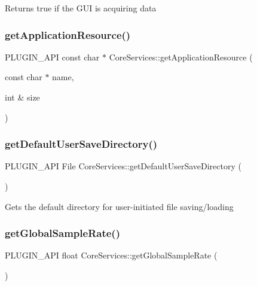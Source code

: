 Returns true if the G\+UI is acquiring data \mbox{\label{namespace_core_services_a40705adde6940ed1b94cf880a0cc54a0}} 
\subsubsection{\texorpdfstring{get\+Application\+Resource()}{getApplicationResource()}}
{\footnotesize\ttfamily P\+L\+U\+G\+I\+N\+\_\+\+A\+PI const char $\ast$ Core\+Services\+::get\+Application\+Resource (\begin{DoxyParamCaption}\item[{const char $\ast$}]{name,  }\item[{int \&}]{size }\end{DoxyParamCaption})}

\mbox{\label{namespace_core_services_a25f9182255aa7c83144c5f65819493bc}} 
\subsubsection{\texorpdfstring{get\+Default\+User\+Save\+Directory()}{getDefaultUserSaveDirectory()}}
{\footnotesize\ttfamily P\+L\+U\+G\+I\+N\+\_\+\+A\+PI File Core\+Services\+::get\+Default\+User\+Save\+Directory (\begin{DoxyParamCaption}{ }\end{DoxyParamCaption})}

Gets the default directory for user-\/initiated file saving/loading \mbox{\label{namespace_core_services_ac9fb78e241aa3805b05d206c78ecfca1}} 
\subsubsection{\texorpdfstring{get\+Global\+Sample\+Rate()}{getGlobalSampleRate()}}
{\footnotesize\ttfamily P\+L\+U\+G\+I\+N\+\_\+\+A\+PI float Core\+Services\+::get\+Global\+Sample\+Rate (\begin{DoxyParamCaption}{ }\end{DoxyParamCaption})}

